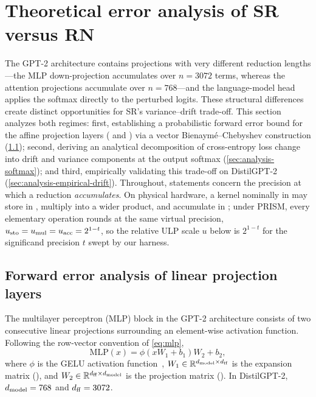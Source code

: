 \section{Theoretical error analysis of SR versus RN}
\label{sec:analysis}

The GPT-2 architecture contains projections with very different reduction
lengths---the MLP down-projection accumulates over $n=3072$ terms, whereas the
attention projections accumulate over $n=768$---and the language-model head
applies the softmax directly to the perturbed logits.  These structural
differences create distinct opportunities for SR's variance--drift trade-off.
This section analyzes both regimes:
first, establishing a probabilistic forward error bound for the affine
projection layers ( and ) via a vector Bienaym\'e--Chebyshev
construction (\cref{sec:analysis-mlp}); second, deriving an analytical decomposition
of cross-entropy loss change into drift and variance components at the output softmax
(\cref{sec:analysis-softmax}); and third, empirically validating this trade-off on DistilGPT-2
(\cref{sec:analysis-empirical-drift}).
Throughout, statements concern the precision at which a reduction \emph{accumulates}.
On physical hardware, a kernel nominally in  may store in ,
multiply into a wider product, and accumulate in ; under PRISM,
every elementary operation rounds at the same virtual precision, $u_{\rm sto} = u_{\rm mul} = u_{\rm acc} = 2^{1-t}$,
so the relative ULP scale $u$ below is $2^{1-t}$ for the significand precision $t$
swept by our harness.

\subsection{Forward error analysis of linear projection layers}
\label{sec:analysis-mlp}

The multilayer perceptron (MLP) block in the GPT-2 architecture consists of two
consecutive linear projections surrounding an element-wise activation function.
Following the row-vector convention of \cref{eq:mlp},
\begin{equation*}
  \text{MLP}(x) = \phi(x W_1 + b_1) W_2 + b_2,
\end{equation*}
where $\phi$ is the GELU activation function~\citep{hendrycks2016gelu},
$W_1 \in \mathbb{R}^{d_{\rm model} \times d_{\rm ff}}$ is the expansion matrix (), and
$W_2 \in \mathbb{R}^{d_{\rm ff} \times d_{\rm model}}$ is the projection matrix ().
In DistilGPT-2, $d_{\rm model} = 768$ and $d_{\rm ff} = 3072$.

